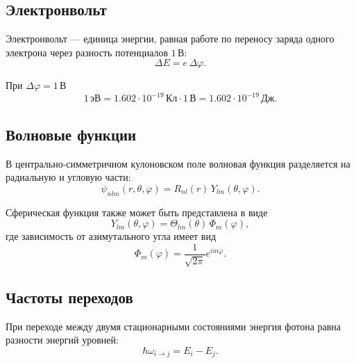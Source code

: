 \documentclass[../final.tex]{subfiles}
\begin{document}
\subsection{Электронвольт}

Электронвольт --- единица энергии, равная работе по переносу заряда
одного электрона через разность потенциалов $1\,\text{В}$:
%
\begin{equation*}
    \Delta E
    =
    e\,\Delta\varphi.
\end{equation*}

При $\Delta\varphi=1\,\text{В}$
%
\begin{equation*}
    1\,\text{эВ}
    =
    1.602\cdot10^{-19}\,\text{Кл}\cdot1\,\text{В}
    =
    1.602\cdot10^{-19}\,\text{Дж}.
\end{equation*}


\subsection{Волновые функции}

В центрально-симметричном кулоновском поле волновая функция
разделяется на радиальную и угловую части:
%
\begin{equation*}
    \psi_{nlm}(r,\theta,\varphi)
    =
    R_{nl}(r)\,
    Y_{lm}(\theta,\varphi).
\end{equation*}

Сферическая функция также может быть представлена в виде
%
\begin{equation*}
    Y_{lm}(\theta,\varphi)
    =
    \Theta_{lm}(\theta)\,
    \Phi_m(\varphi),
\end{equation*}
%
где зависимость от азимутального угла имеет вид
%
\begin{equation*}
    \Phi_m(\varphi)
    =
    \frac{1}{\sqrt{2\pi}}
    e^{im\varphi}.
\end{equation*}


\subsection{Частоты переходов}

При переходе между двумя стационарными состояниями энергия фотона
равна разности энергий уровней:
%
\begin{equation*}
    \hbar\omega_{i\rightarrow j}
    =
    E_i-E_j.
\end{equation*}
\end{document}

